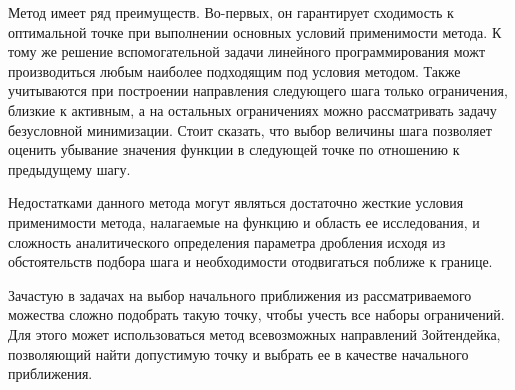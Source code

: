 \documentclass[../body.tex]{subfiles}
\begin{document}
Метод имеет ряд преимуществ. Во-первых, он гарантирует сходимость к оптимальной точке при выполнении основных условий применимости метода. К тому же решение вспомогательной задачи линейного программирования можт производиться любым наиболее подходящим под условия методом. Также учитываются при построении направления следующего шага только ограничения, близкие к активным, а на остальных ограничениях можно рассматривать задачу безусловной минимизации. Стоит сказать, что выбор величины шага позволяет оценить убывание значения функции в следующей точке по отношению к предыдущему шагу.

Недостатками данного метода могут являться достаточно жесткие условия применимости метода, налагаемые на функцию и область ее исследования, и сложность аналитического определения параметра дробления исходя из обстоятельств подбора шага и необходимости отодвигаться поближе к границе.

Зачастую в задачах на выбор начального приближения из рассматриваемого можества сложно подобрать такую точку, чтобы учесть все наборы ограничений. Для этого может использоваться метод всевозможных направлений Зойтендейка, позволяющий найти допустимую точку и выбрать ее в качестве начального приближения.
\end{document}
